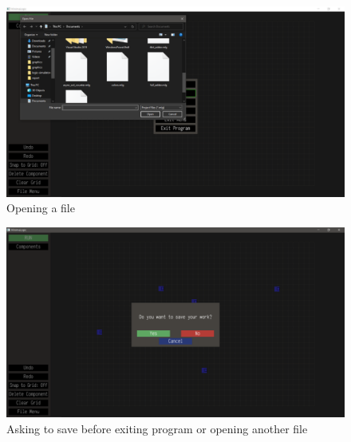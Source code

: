\documentclass[report]{subfiles}
\begin{document}
\begin{figure}[H]
    \centering
    \includegraphics[width=\textwidth]{graphics/opening_file.png}
    \caption{Opening a file}
\end{figure}
\begin{figure}[H]
    \centering
    \includegraphics[width=\textwidth]{graphics/confirm_save.png}
    \caption{Asking to save before exiting program or opening another file}
\end{figure}
\end{document}
